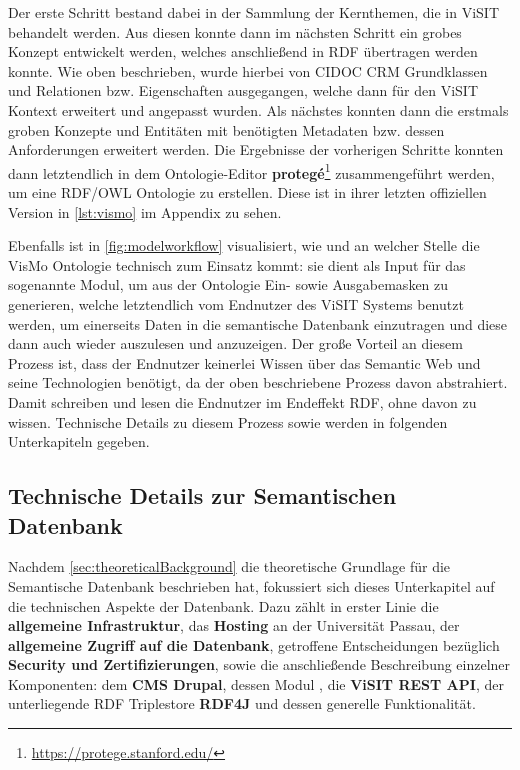 Der erste Schritt bestand dabei in der Sammlung der Kernthemen, die in ViSIT behandelt werden. Aus diesen konnte dann im nächsten Schritt ein grobes Konzept entwickelt werden, welches anschließend in RDF übertragen werden konnte. Wie oben beschrieben, wurde hierbei von CIDOC CRM Grundklassen und Relationen bzw. Eigenschaften ausgegangen, welche dann für den ViSIT Kontext erweitert und angepasst wurden. Als nächstes konnten dann die erstmals groben Konzepte und Entitäten mit benötigten Metadaten bzw. dessen Anforderungen erweitert werden. Die Ergebnisse der vorherigen Schritte konnten dann letztendlich in dem Ontologie-Editor \textbf{protegé}\footnote{\url{https://protege.stanford.edu/}} zusammengeführt werden, um eine RDF/OWL Ontologie zu erstellen. Diese ist in ihrer letzten offiziellen Version in \autoref{lst:vismo} im Appendix zu sehen.

Ebenfalls ist in \autoref{fig:modelworkflow} visualisiert, wie und an welcher Stelle die VisMo Ontologie technisch zum Einsatz kommt: sie dient als Input für das sogenannte \wisski Modul, um aus der Ontologie Ein- sowie Ausgabemasken zu generieren, welche letztendlich vom Endnutzer des ViSIT Systems benutzt werden, um einerseits Daten in die semantische Datenbank einzutragen und diese dann auch wieder auszulesen und anzuzeigen. Der große Vorteil an diesem Prozess ist, dass der Endnutzer keinerlei Wissen über das Semantic Web und seine Technologien benötigt, da der oben beschriebene Prozess davon abstrahiert. Damit schreiben und lesen die Endnutzer im Endeffekt RDF, ohne davon zu wissen. Technische Details zu diesem Prozess sowie \wisski werden in folgenden Unterkapiteln gegeben.

\subsection{Technische Details zur Semantischen Datenbank}\label{sec:technicalBackground}

Nachdem \autoref{sec:theoreticalBackground} die theoretische Grundlage für die Semantische Datenbank beschrieben hat, fokussiert sich dieses Unterkapitel auf die technischen Aspekte der Datenbank. Dazu zählt in erster Linie die \textbf{allgemeine Infrastruktur}, das \textbf{Hosting} an der Universität Passau, der \textbf{allgemeine Zugriff auf die Datenbank}, getroffene Entscheidungen bezüglich \textbf{Security und Zertifizierungen}, sowie die anschließende Beschreibung einzelner Komponenten: dem \textbf{CMS Drupal}, dessen Modul \textbf{\wisski}, die \textbf{ViSIT REST API}, der unterliegende RDF Triplestore \textbf{RDF4J} und dessen generelle Funktionalität.

